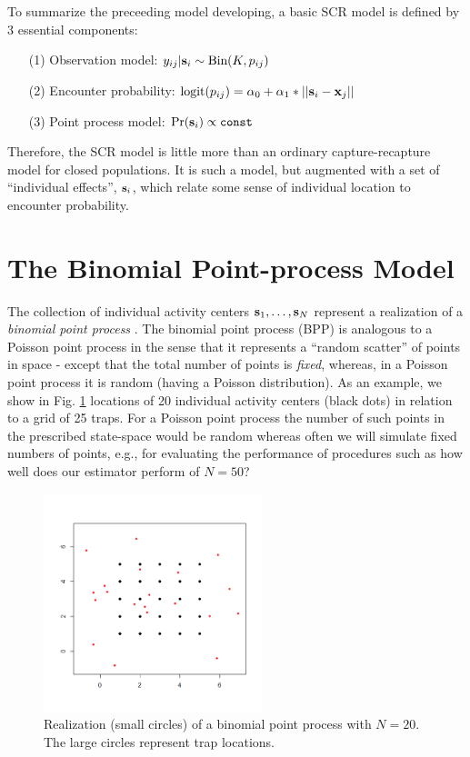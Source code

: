 To summarize the preceeding model developing, a basic SCR model is
defined by 3 essential components:
\begin{itemize}
\item[(1)] Observation model: $y_{ij}|{\bf s}_{i} \sim \mbox{Bin}(K, p_{ij})$
\item[(2)] Encounter probability: $\mbox{logit}(p_{ij}) = \alpha_{0} +
  \alpha_{1}*||{\bf s}_{i}-{\bf x}_{j}||$
\item[(3)] Point process model: $\Pr({\bf s}_{i} ) \propto \mbox{\tt const}$
\end{itemize}
Therefore, the SCR model is little more than an ordinary
capture-recapture model for closed populations. It is such a model,
but augmented with a set of ``individual effects'', ${\bf s}_{i}$,
which relate some sense of individual location to encounter
probability. 

\section{ The Binomial Point-process Model}

The collection of individual activity centers ${\bf s}_{1},\ldots,
{\bf s}_{N}$ represent a realization of a {\it binomial point process}
\citep[][p. xyz]{illian_etal:2008}.  The binomial point process (BPP)
is analogous to a Poisson point process in the sense that it
represents a ``random scatter'' of points in space - except that the
total number of points is {\it fixed}, whereas, in a Poisson point
process it is random (having a Poisson distribution).  As an example,
we show in Fig. \ref{scr0.fig.bpp} locations of 20 individual activity
centers (black dots) in relation to a grid of 25 traps. For a Poisson
point process the number of such points in the prescribed state-space
would be random whereas often we will simulate fixed numbers of
points, e.g., for evaluating the performance of procedures such as how
well does our estimator perform of $N=50$?
\begin{figure}
\begin{center}
\includegraphics[height=2.5in]{Ch4/figs/binomialpoint}
\end{center}
\caption{Realization (small circles) of a binomial point process with $N=20$. The
  large circles represent trap locations.}
\label{scr0.fig.bpp}
\end{figure}

